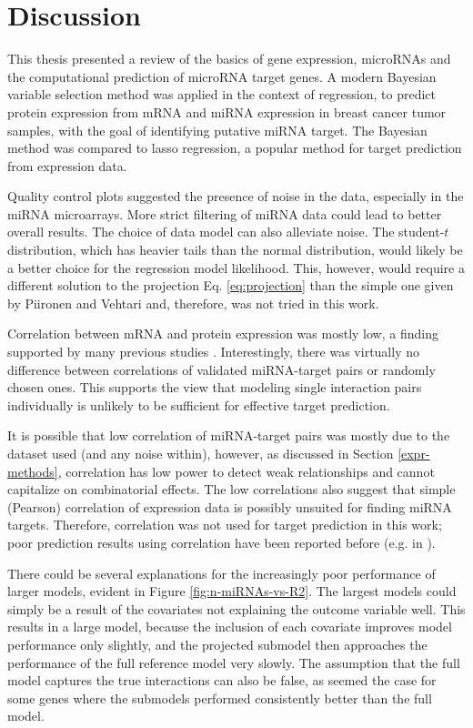 
\section{Discussion}

This thesis presented a review of the basics of gene expression, microRNAs and
the computational prediction of microRNA target genes. A modern Bayesian
variable selection method was applied in the context of regression, to predict
protein expression from mRNA and miRNA expression in breast cancer tumor
samples, with the goal of identifying putative miRNA target. The Bayesian
method was compared to lasso regression, a popular method for target
prediction from expression data.

Quality control plots suggested the presence of noise in the data, especially
in the miRNA microarrays. More strict filtering of miRNA data could lead to
better overall results. The choice of data model can also alleviate noise. The
student-$t$ distribution, which has heavier tails than the normal
distribution, would likely be a better choice for the regression model
likelihood. This, however, would require a different solution to the
projection Eq. \eqref{eq:projection} than the simple one given by Piironen
and Vehtari \citep{Piironen2015} and, therefore, was not tried in this work.

Correlation between mRNA and protein expression was mostly low, a finding
supported by many previous studies \citep{Payne2015}. Interestingly, there was
virtually no difference between correlations of validated miRNA-target pairs
or randomly chosen ones. This supports the view that modeling single
interaction pairs individually is unlikely to be sufficient for effective target
prediction.

It is possible that low correlation of miRNA-target pairs was mostly due to the
dataset used (and any noise within), however, as discussed in Section \ref{expr-methods},
correlation has low power to detect weak relationships and
cannot capitalize on combinatorial effects. The low correlations also suggest
that simple (Pearson) correlation of expression data is possibly unsuited for
finding miRNA targets.  Therefore, correlation was not used for target
prediction in this work; poor prediction results using correlation have been
reported before (e.g. in
\citep{Muniategui2012}).

There could be several explanations for the increasingly poor performance of
larger models, evident in Figure \ref{fig:n-miRNAs-vs-R2}. The largest models
could simply be a result of the covariates not explaining the outcome variable
well. This results in a large model, because the inclusion of each covariate
improves model performance only slightly, and the projected submodel then
approaches the performance of the full reference model very slowly. The
assumption that the full model captures the true interactions can also be
false, as seemed the case for some genes where the submodels performed 
consistently better than the full model.

